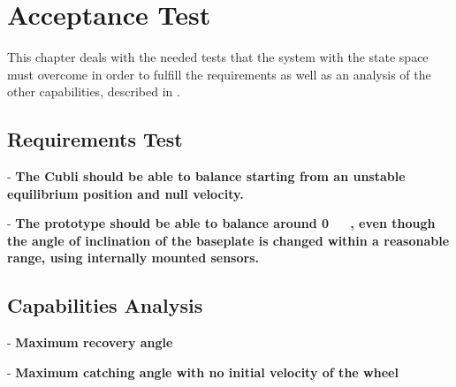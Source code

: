 \chapter{Acceptance Test}
This chapter deals with the needed tests that the system with the state space must overcome in order to fulfill the requirements as well as an analysis of the other capabilities, described in .

\section{Requirements Test}

- \textbf{The Cubli should be able to balance starting from an unstable equilibrium position and null velocity.}

- \textbf{The prototype should be able to balance around \si{0\ \rad}, even though the angle of inclination of the baseplate is changed within a reasonable range, using internally mounted sensors.}


\section{Capabilities Analysis}
- \textbf{Maximum recovery angle}

- \textbf{Maximum catching angle with no initial velocity of the wheel}
